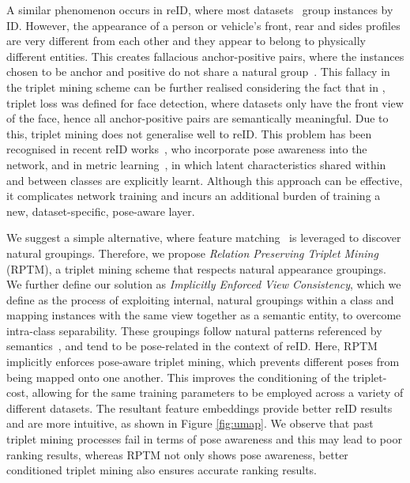 \documentclass[10pt,twocolumn,letterpaper]{article}
\begin{document}
A similar phenomenon occurs in reID, where most datasets~\cite{liu2016deep,liu2016large,ristani2016performance}
group instances by ID. 
However, the appearance of a person or vehicle's front, rear and sides profiles are very different from each other and they appear to belong to physically different entities. 
This creates fallacious anchor-positive pairs, where the instances chosen to be anchor and positive do not share a natural group~\cite{bai2018group}.
This fallacy in the triplet mining scheme can be further realised considering the fact that in \cite{schroff2015facenet}, triplet loss was defined for face detection, where datasets only have the front view of the face, hence all anchor-positive pairs are semantically meaningful. Due to this, triplet mining does not generalise well to reID. 
This problem has been recognised in recent reID works~\cite{chu2019vehicle,khorramshahi2020devil,liu2021spatial,meng2020parsing,tang2019pamtri}, who incorporate pose awareness into the network, and in metric learning~\cite{roth2019mic}, in which latent characteristics shared within and between classes are explicitly learnt.
Although this approach can be effective, it complicates network training and incurs an additional burden of training a new, dataset-specific, pose-aware layer. 

We suggest a simple alternative, where feature matching~\cite{bian2017gms,lowe1999object} is leveraged to discover natural groupings. 
Therefore, we propose \textit{Relation Preserving Triplet Mining} (RPTM), a triplet mining scheme that respects natural appearance groupings. 
We further define our solution as \textit{Implicitly Enforced View Consistency}, which we define as the process of exploiting internal, natural groupings within a class and mapping instances with the same view together as a semantic entity, to overcome intra-class separability.  
These groupings follow natural patterns referenced by semantics~\cite{lin2021shell}, and tend to be pose-related in the context of  reID.  
Here,  RPTM  implicitly enforces pose-aware triplet mining, which prevents  different poses from being  mapped onto one another.
This improves the conditioning of the   triplet-cost, allowing  for the same training  parameters to be employed across a variety of different datasets.  
 The resultant feature embeddings provide better reID results and are more intuitive,  as  shown in Figure \ref{fig:umap}. We observe that past triplet mining processes fail in terms of pose awareness and this may lead to poor ranking results, whereas RPTM not only shows pose awareness, better conditioned triplet mining also ensures accurate ranking results.
 
\end{document}
